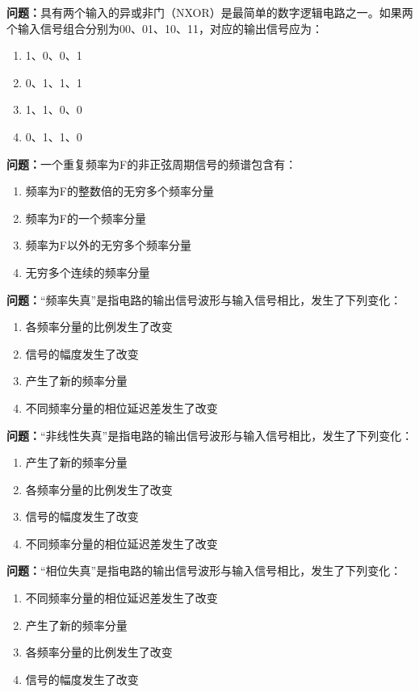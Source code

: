 \bigskip


\noindent\textbf{问题：}具有两个输入的异或非门（NXOR）是最简单的数字逻辑电路之一。如果两个输入信号组合分别为00、01、10、11，对应的输出信号应为：
\begin{enumerate}[label=\Alph*), leftmargin=3em]
\item 1、0、0、1
\item 0、1、1、1
\item 1、1、0、0
\item 0、1、1、0
\end{enumerate}

\bigskip


\noindent\textbf{问题：}一个重复频率为F的非正弦周期信号的频谱包含有：
\begin{enumerate}[label=\Alph*), leftmargin=3em]
\item 频率为F的整数倍的无穷多个频率分量
\item 频率为F的一个频率分量
\item 频率为F以外的无穷多个频率分量
\item 无穷多个连续的频率分量
\end{enumerate}

\bigskip


\noindent\textbf{问题：}“频率失真”是指电路的输出信号波形与输入信号相比，发生了下列变化：
\begin{enumerate}[label=\Alph*), leftmargin=3em]
\item 各频率分量的比例发生了改变
\item 信号的幅度发生了改变
\item 产生了新的频率分量
\item 不同频率分量的相位延迟差发生了改变
\end{enumerate}

\bigskip


\noindent\textbf{问题：}“非线性失真”是指电路的输出信号波形与输入信号相比，发生了下列变化：
\begin{enumerate}[label=\Alph*), leftmargin=3em]
\item 产生了新的频率分量
\item 各频率分量的比例发生了改变
\item 信号的幅度发生了改变
\item 不同频率分量的相位延迟差发生了改变
\end{enumerate}

\bigskip


\noindent\textbf{问题：}“相位失真”是指电路的输出信号波形与输入信号相比，发生了下列变化：
\begin{enumerate}[label=\Alph*), leftmargin=3em]
\item 不同频率分量的相位延迟差发生了改变
\item 产生了新的频率分量
\item 各频率分量的比例发生了改变
\item 信号的幅度发生了改变
\end{enumerate}

